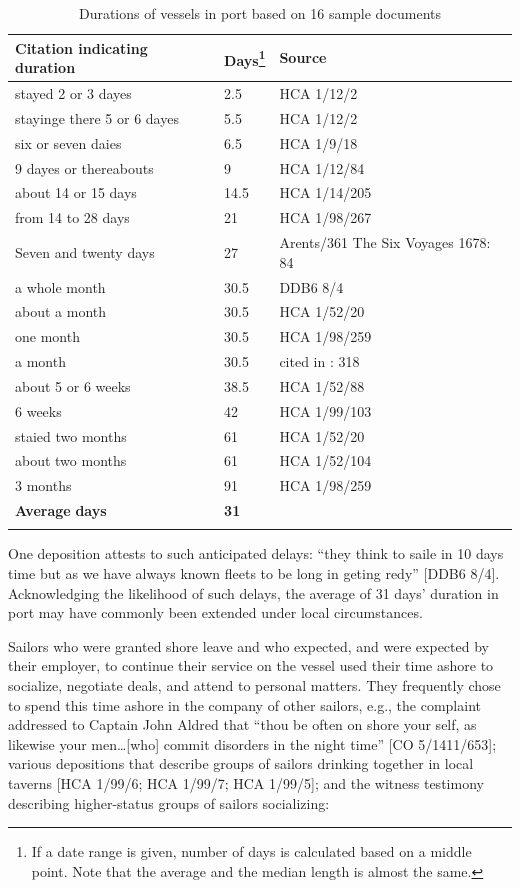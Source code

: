 \begin{table}
\caption{\label{tab:key:4.4} Durations of vessels in port based on 16 sample documents}

\begin{tabularx}{\textwidth}{Qll}
\lsptoprule
\textbf{Citation} \textbf{indicating} \textbf{duration} & \textbf{Days}\footnote{If a date range is given, number of days is calculated based on a middle point. Note that the average and the median length is almost the same.} & \textbf{Source}\\
\midrule
 stayed 2 or 3 dayes & 2.5 & HCA 1/12/2\\
stayinge there 5 or 6 dayes & 5.5 & HCA 1/12/2\\
six or seven daies & 6.5 & HCA 1/9/18\\
9 dayes or thereabouts & 9 & HCA 1/12/84\\
about 14 or 15 days & 14.5 & HCA 1/14/205\\
from 14 to 28 days & 21 & HCA 1/98/267\\
Seven and twenty days & 27 & Arents/361 The Six  {Voyages 1678}: 84\\
a whole month & 30.5 & DDB6 8/4\\
about a month & 30.5 & HCA 1/52/20\\
one month & 30.5 & HCA 1/98/259\\
a month & 30.5 & cited in \citealt{Bicheno2012}: 318\\
about 5 or 6 weeks & 38.5 & HCA 1/52/88\\
6 weeks & 42 & HCA 1/99/103\\
staied two months & 61 & HCA 1/52/20\\
about two months & 61 & HCA 1/52/104\\
3 months & 91 & HCA 1/98/259\\
\midrule 
 \textbf{Average} \textbf{days} & \textbf{31} & \\
\lspbottomrule
\end{tabularx} 
\end{table}

One deposition attests to such anticipated delays: “they think to saile in 10 days time but as we have always known fleets to be long in geting redy” [DDB6 8/4]. Acknowledging the likelihood of such delays, the average of 31 days’ duration in port may have commonly been extended under local circumstances.

Sailors who were granted shore leave and who expected, and were expected by their employer, to continue their service on the vessel used their time ashore to socialize, negotiate deals, and attend to personal matters. They frequently chose to spend this time ashore in the company of other sailors, e.g., the complaint addressed to Captain John Aldred that “thou be often on shore your self, as likewise your men…[who] commit disorders in the night time” [CO 5/1411/653]; various depositions that describe groups of sailors drinking together in local taverns [HCA 1/99/6; HCA 1/99/7; HCA 1/99/5]; and the witness testimony describing higher-status groups of sailors socializing:

